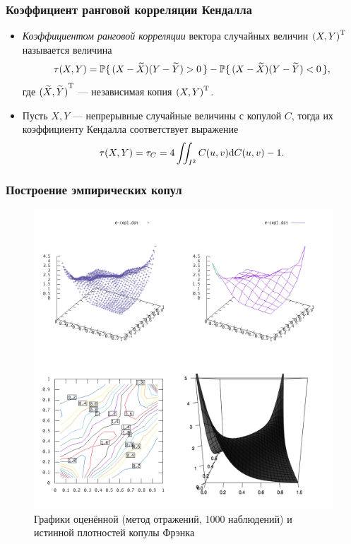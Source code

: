 \documentclass[11pt]{beamer}
\begin{document}
\begin{frame}
\frametitle{Коэффициент ранговой корреляции Кендалла}
\begin{itemize}
  \item \emph{Коэффициентом ранговой корреляции} вектора случайных величин $\trans{(X, Y)}$ называется величина
\begin{equation}
  \tau(X, Y) = \P\{\, (X - \widetilde{X})(Y - \widetilde{Y}) > 0 \,\} - \P\{\, (X - \widetilde{X})(Y - \widetilde{Y}) < 0 \,\},
\end{equation}
где $\trans{(\widetilde{X}, \widetilde{Y})}$ --- независимая копия $\trans{(X, Y)}$. \par

\item Пусть $X, Y$ --- непрерывные случайные величины с копулой $C$, тогда их коэффициенту Кендалла соответствует выражение
  \[
  \tau(X, Y) = \tau_C = 4 \iint_{I^2} C(u, v) \d C(u,v) - 1.
  \]
\end{itemize}
\end{frame}

\begin{frame}
\begin{center}
\frametitle{Построение эмпирических копул}
\begin{figure}[H]
  \centering
  \includegraphics[width=.56\textwidth]{FrankMirror.png}
  \caption{Графики оценённой (метод отражений, 1000 наблюдений) и истинной плотностей копулы Фрэнка}
\end{figure}
\end{center}
\end{frame}
\end{document}
